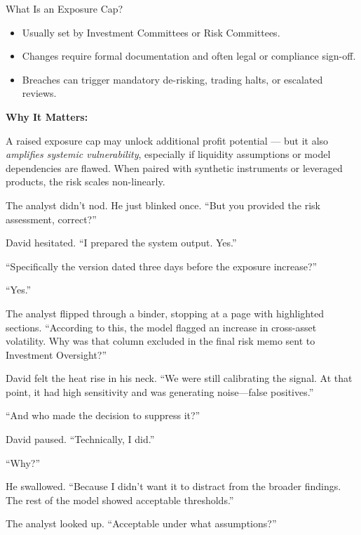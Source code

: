 \begin{TechnicalSidebar}{What Is an Exposure Cap?}
  \medskip

  \begin{itemize}
    \item Usually set by Investment Committees or Risk Committees.
    \item Changes require formal documentation and often legal or compliance sign-off.
    \item Breaches can trigger mandatory de-risking, trading halts, or escalated reviews.
  \end{itemize}
  
  \medskip

  \textbf{Why It Matters:}  
  
  \medskip

  A raised exposure cap may unlock additional profit potential — but it also \textit{amplifies systemic 
  vulnerability}, especially if liquidity assumptions or model dependencies are flawed. When paired with 
  synthetic instruments or leveraged products, the risk scales non-linearly.
  
\end{TechnicalSidebar}

\medskip


The analyst didn’t nod. He just blinked once. ``But you provided the risk assessment, correct?''

David hesitated. ``I prepared the system output. Yes.''

``Specifically the version dated three days before the exposure increase?''

``Yes.''

The analyst flipped through a binder, stopping at a page with highlighted sections. ``According to this, the model 
flagged an increase in cross-asset volatility. Why was that column excluded in the final risk memo sent to 
Investment Oversight?''

David felt the heat rise in his neck. ``We were still calibrating the signal. At that point, it had high sensitivity 
and was generating noise—false positives.''

``And who made the decision to suppress it?''

David paused. ``Technically, I did.''

``Why?''

He swallowed. ``Because I didn’t want it to distract from the broader findings. The rest of the model showed 
acceptable thresholds.''

The analyst looked up. ``Acceptable under what assumptions?''

